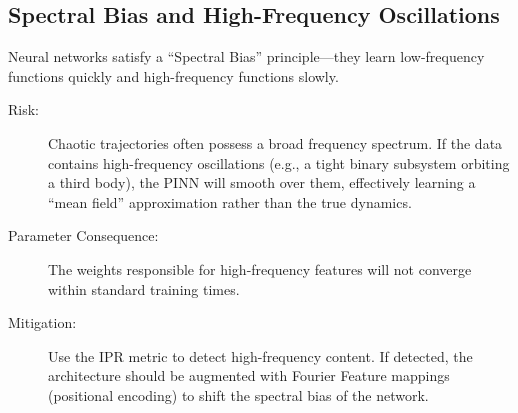 \subsection{Spectral Bias and High-Frequency Oscillations}

Neural networks satisfy a ``Spectral Bias'' principle—they learn low-frequency functions quickly and high-frequency functions slowly.
\begin{description}
    \item[Risk:] Chaotic trajectories often possess a broad frequency spectrum. If the data contains high-frequency oscillations (e.g., a tight binary subsystem orbiting a third body), the PINN will smooth over them, effectively learning a ``mean field'' approximation rather than the true dynamics.
    \item[Parameter Consequence:] The weights responsible for high-frequency features will not converge within standard training times.
    \item[Mitigation:] Use the IPR metric to detect high-frequency content. If detected, the architecture should be augmented with Fourier Feature mappings (positional encoding) to shift the spectral bias of the network.
\end{description}